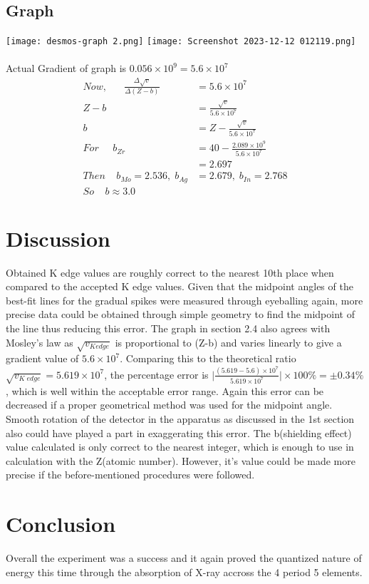 \documentclass{article}
\begin{document}
\subsection{Graph}
\texttt{[image: desmos-graph 2.png]}
\texttt{[image: Screenshot 2023-12-12 012119.png]}
\\\\
Actual Gradient of graph is $0.056\times10^9=5.6\times10^7$
\\
\begin{align*}
Now,\;\;\;\;\;\;\frac{\Delta\sqrt{v}}{\Delta(Z-b)}&=5.6\times10^7\\
    Z-b&=\frac{\sqrt{v}
    }{5.6\times10^7}\\
    b&=Z-\frac{\sqrt{v}}{5.6\times10^7}\\
    For\;\;\;\;\;
    b_{Zr}&=40-\frac{2.089\times10^9}{5.6\times10^7}\\
    &=2.697
    \\Then\;\;\;\;b_{Mo}=2.536,\;b_{Ag}&=2.679,\;b_{In}=2.768\\
    So\;\;\;\;b\approx 3.0
\end{align*}
\newpage
\section{Discussion}
Obtained K edge values are roughly correct to the nearest 10th place when compared to the accepted K edge values. Given that the midpoint angles of the best-fit lines for the gradual spikes were measured through eyeballing again, more precise data could be obtained through simple geometry to find the midpoint of the line thus reducing this error. The graph in section 2.4 also agrees with Mosley's law as $\sqrt{v_{K edge}}$ is proportional to (Z-b) and varies linearly to give a gradient value of $5.6\times10^7$. Comparing this to the theoretical ratio $\sqrt{v_{K\;edge}}=5.619\times 10^7$, the percentage error is $\Big|\frac{(5.619-5.6)\times10^7}{5.619\times10^7}\Big|\times100\%=\pm0.34\%$, which is well within the acceptable error range. Again this error can be decreased if a proper geometrical method was used for the midpoint angle. Smooth rotation of the detector in the apparatus as discussed in the 1st section also could have played a part in exaggerating this error. The b(shielding effect) value calculated is only correct to the nearest integer, which is enough to use in calculation with the Z(atomic number). However, it's value could be made more precise if the before-mentioned procedures were followed.
\section{Conclusion}
Overall the experiment was a success and it again proved the quantized nature of energy this time through the absorption of X-ray accross the 4 period 5 elements.
\end{document}
